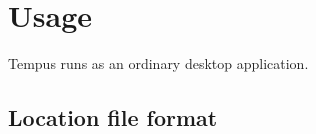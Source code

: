 \section{Usage}

Tempus runs as an ordinary desktop application.

\subsection{Location file format}
